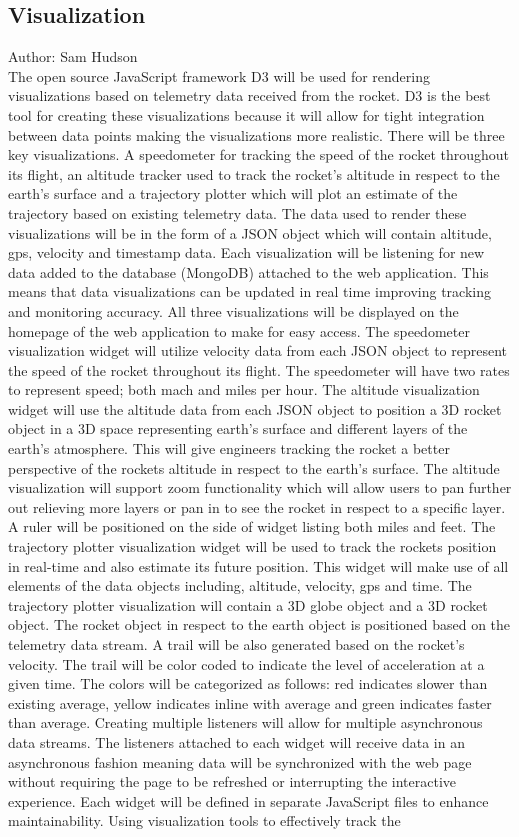 \documentclass[onecolumn, draftclsnofoot,10pt, compsoc]{IEEEtran}
\begin{document}
\subsection {Visualization}
Author: Sam Hudson\\
The open source JavaScript framework D3 will be used for rendering visualizations based on telemetry data received from the rocket. D3 is the best tool for creating these visualizations because it will allow for tight integration between data points making the visualizations more realistic. There will be three key visualizations. A speedometer for tracking the speed of the rocket throughout its flight, an altitude tracker used to track the rocket’s altitude in respect to the earth’s surface and a trajectory plotter which will plot an estimate of the trajectory based on existing telemetry data. The data used to render these visualizations will be in the form of a JSON object which will contain altitude, gps, velocity and timestamp data. Each visualization will be listening for new data added to the database (MongoDB) attached to the web application. This means that data visualizations can be updated in real time improving tracking and monitoring accuracy. All three visualizations will be displayed on the homepage of the web application to make for easy access. The speedometer visualization widget will utilize velocity data from each JSON object to represent the speed of the rocket throughout its flight. The speedometer will have two rates to represent speed; both mach and miles per hour. The altitude visualization widget will use the altitude data from each JSON object to position a 3D rocket object in a 3D space representing earth's surface and different layers of the earth’s atmosphere. This will give engineers tracking the rocket a better perspective of the rockets altitude in respect to the earth's surface. The altitude visualization will support zoom functionality which will allow users to pan further out relieving more layers or pan in to see the rocket in respect to a specific layer. A ruler will be positioned on the side of widget listing both miles and feet. The trajectory plotter visualization widget will be used to track the rockets position in real-time and also estimate its future position. This widget will make use of all elements of the data objects including, altitude, velocity, gps and time. The trajectory plotter visualization will contain a 3D globe object and a 3D rocket object. The rocket object in respect to the earth object is positioned based on the telemetry data stream. A trail will be also generated based on the rocket’s velocity. The trail will be color coded to indicate the level of acceleration at a given time. The colors will be categorized as follows: red indicates slower than existing average, yellow indicates inline with average and green indicates faster than average. Creating multiple listeners will allow for multiple asynchronous data streams. The listeners attached to each widget will receive data in an asynchronous fashion meaning data will be synchronized with the web page without requiring the page to be refreshed or interrupting the interactive experience. Each widget will be defined in separate JavaScript files to enhance maintainability. Using visualization tools to effectively track the 
\end{document}
